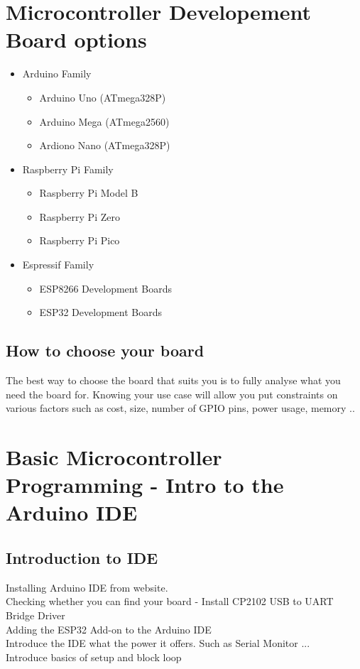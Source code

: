 \documentclass[a4paper,12pt]{report}
\begin{document}
\pagebreak

\section*{Microcontroller Developement Board options}
\begin{itemize}
    \item Arduino Family
    \begin{itemize}
        \item Arduino Uno (ATmega328P)
        \item Arduino Mega (ATmega2560)
        \item Ardiono Nano (ATmega328P)
    \end{itemize}
    \item Raspberry Pi Family 
    \begin{itemize}
        \item Raspberry Pi Model B
        \item Raspberry Pi Zero
        \item Raspberry Pi Pico
    \end{itemize}
    \item Espressif Family
    \begin{itemize}
        \item ESP8266 Development Boards
        \item ESP32 Development Boards
    \end{itemize}
\end{itemize}

\subsection*{How to choose your board} 
The best way to choose the board that suits you is to fully analyse what you need the board for. Knowing your use case will allow you put constraints on various factors such as cost, size, number of GPIO pins, power usage, memory ..

\section*{Basic Microcontroller Programming - Intro to the Arduino IDE}

\subsection*{Introduction to IDE}
Installing Arduino IDE from website.\\
Checking whether you can find your board - Install CP2102 USB to UART Bridge Driver\\
Adding the ESP32 Add-on to the Arduino IDE\\
Introduce the IDE what the power it offers. Such as Serial Monitor ...\\
Introduce basics of setup and block loop {}\\
\end{document}
